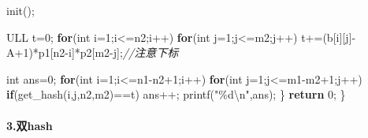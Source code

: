 \documentclass[
]{article}
\newenvironment{Shaded}{}{}
\newcommand{\CharTok}[1]{\textcolor[rgb]{0.25,0.44,0.63}{#1}}
\newcommand{\CommentTok}[1]{\textcolor[rgb]{0.38,0.63,0.69}{\textit{#1}}}
\newcommand{\ControlFlowTok}[1]{\textcolor[rgb]{0.00,0.44,0.13}{\textbf{#1}}}
\newcommand{\DataTypeTok}[1]{\textcolor[rgb]{0.56,0.13,0.00}{#1}}
\newcommand{\DecValTok}[1]{\textcolor[rgb]{0.25,0.63,0.44}{#1}}
\newcommand{\NormalTok}[1]{#1}
\newcommand{\SpecialCharTok}[1]{\textcolor[rgb]{0.25,0.44,0.63}{#1}}
\newcommand{\StringTok}[1]{\textcolor[rgb]{0.25,0.44,0.63}{#1}}
\begin{document}
\begin{Shaded}
\begin{Highlighting}[]
\NormalTok{        init();}

\NormalTok{        ULL t=}\DecValTok{0}\NormalTok{;}
        \ControlFlowTok{for}\NormalTok{(}\DataTypeTok{int}\NormalTok{ i=}\DecValTok{1}\NormalTok{;i\textless{}=n2;i++)}
            \ControlFlowTok{for}\NormalTok{(}\DataTypeTok{int}\NormalTok{ j=}\DecValTok{1}\NormalTok{;j\textless{}=m2;j++)}
\NormalTok{                t+=(b[i][j]{-}}\CharTok{\textquotesingle{}A\textquotesingle{}}\NormalTok{+}\DecValTok{1}\NormalTok{)*p1[n2{-}i]*p2[m2{-}j];}\CommentTok{//注意下标}

        \DataTypeTok{int}\NormalTok{ ans=}\DecValTok{0}\NormalTok{;}
        \ControlFlowTok{for}\NormalTok{(}\DataTypeTok{int}\NormalTok{ i=}\DecValTok{1}\NormalTok{;i\textless{}=n1{-}n2+}\DecValTok{1}\NormalTok{;i++)}
            \ControlFlowTok{for}\NormalTok{(}\DataTypeTok{int}\NormalTok{ j=}\DecValTok{1}\NormalTok{;j\textless{}=m1{-}m2+}\DecValTok{1}\NormalTok{;j++)}
                \ControlFlowTok{if}\NormalTok{(get\_hash(i,j,n2,m2)==t)}
\NormalTok{                    ans++;}
\NormalTok{        printf(}\StringTok{"}\SpecialCharTok{\%d\textbackslash{}n}\StringTok{"}\NormalTok{,ans);}
\NormalTok{    \}}
    \ControlFlowTok{return} \DecValTok{0}\NormalTok{;}
\NormalTok{\}}
\end{Highlighting}
\end{Shaded}

\hypertarget{ux53cchash}{%
\paragraph{3.双hash}\label{ux53cchash}}
\end{document}
